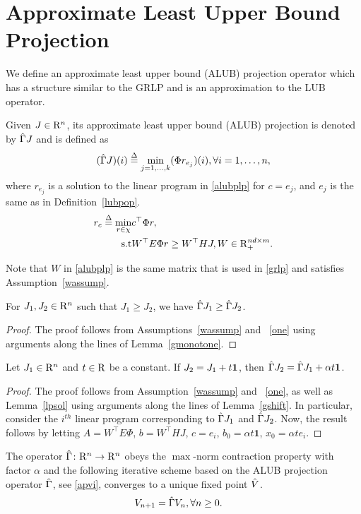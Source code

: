 \section{Approximate Least Upper Bound Projection}\label{sec:alubp}
We define an approximate least upper bound (ALUB) projection operator which has a structure similar to the GRLP and is an approximation to the LUB operator.
\begin{definition}\label{alubpop}
Given $J\in \mathrm{R}^n$, its approximate least upper bound (ALUB) projection is denoted by $\hat{\Gamma} J$ and is defined as 
\begin{align}\label{tgamdef}
(\hg J)(i)\stackrel{\Delta}{=}\underset{j=1,\ldots,k}{\min} (\Phi r_{e_j})(i), \mb \forall i=1,\ldots,n,
\end{align}
where $r_{e_j}$ is a solution to the linear program in \eqref{alubplp} for $c=e_j$, and $e_j$ is the same as in Definition~\ref{lubpop}.
\begin{align}\label{alubplp}
r_c\stackrel{\Delta}{=}\min_{r\in \chi} &c^\top \Phi r,\nn\\
\text{s.t}\mb &W^\top E \Phi r\geq W^\top HJ, W \in \R^{nd\times m}_+ .
\end{align}
\end{definition}
Note that $W$ in \eqref{alubplp} is the same matrix that is used in \eqref{grlp} and satisfies Assumption~\ref{wassump}.
\begin{lemma}\label{tgmonotone}
For $J_1, J_2\in \mathrm{R}^n$ such that $J_1\geq J_2$, we have $\hat{\Gamma} J_1\geq \hat{\Gamma} J_2$.
\end{lemma}
\begin{proof}
The proof follows from Assumptions~\ref{wassump} and ~\ref{one} using arguments along the lines of Lemma~\ref{gmonotone}.
\end{proof}
\begin{lemma}\label{tgshift}
Let $J_1\in \mathrm{R}^n$ and $t\in \mathrm{R}$ be a constant. If $J_2=J_1+t\mathbf{1}$, then $\hat{\Gamma} J_2=\hat{\Gamma} J_1+\alpha t\mathbf{1}$.
\end{lemma}
\begin{proof}
The proof follows from Assumption~\ref{wassump} and ~\ref{one}, as well as Lemma~\ref{lpsol} using arguments along the lines of Lemma~\ref{gshift}. In particular, consider the $i^{th}$ linear program corresponding to $\hat{\Gamma} J_1$ and $\hat{\Gamma} J_2$. Now, the result follows by letting $A=W^\top E \Phi$, $b=W^\top H J$, $c=e_i$, $b_0=\alpha t \mathbf{1}$, $x_0=\alpha t e_i$.
\end{proof}
\begin{theorem}\label{tgmaxcontra}
The operator $\hat{\Gamma} \colon \mathrm{R}^n\rightarrow \mathrm{R}^n$ obeys the $\max$-norm contraction property with factor $\alpha$ and the following iterative scheme based on the ALUB projection operator $\hat{\Gamma}$, see \eqref{apvi}, converges to a unique fixed point $\hat{V}$.
\begin{align}\label{apvi}
V_{n+1}&=\hg V_n,\mb\forall n\geq 0.
\end{align}
\end{theorem}
